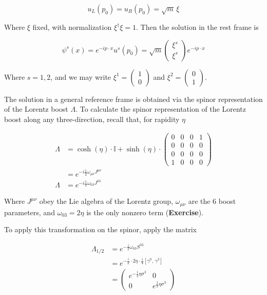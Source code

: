 \begin{equation}
u_L(p_0) = u_R(p_0) = \sqrt{m} \, \xi
\end{equation}

\noindent Where $\xi$ fixed, with normalization $\xi^\dagger \xi = 1$. Then the solution in the rest frame is 

\begin{equation}
\psi^s(x) = e^{-i p \cdot x} u^s(p_0) = \sqrt{m} \left(\begin{array}{c} \xi^s \\ \xi^s \end{array} \right) e^{-i p \cdot x}
\end{equation}

\noindent Where $s=1,2$, and we may write $\xi^1 = \left( \begin{array}{c} 1 \\ 0 \end{array} \right)$ and $\xi^2 = \left( \begin{array}{c} 0 \\ 1 \end{array} \right)$.

\noindent The solution in a general reference frame is obtained via the spinor representation of the Lorentz boost $\Lambda$. To calculate the spinor representation of the Lorentz boost along any three-direction, recall that, for rapidity $\eta$

\begin{align}
\Lambda &= \cosh (\eta) \cdot \mathbb{I} + \sinh(\eta) \cdot \left( \begin{array}{cccc} 0&0&0&1\\0&0&0&0\\0&0&0&0\\1&0&0&0 \end{array} \right) \\
&= e^{-i \frac{1}{2} \omega_{\mu\nu} J^{\mu\nu}} \\
\Lambda &= e^{-i \frac{1}{2} \omega_{0 3} J^{0 3} }
\end{align}

\noindent Where $J^{\mu\nu}$ obey the Lie algebra of the Lorentz group, $\omega_{\mu\nu}$ are the 6 boost parameters, and $\omega_{0 3}=2\eta$ is the only nonzero term (\textbf{Exercise}).

\noindent To apply this transformation on the spinor, apply the matrix

\begin{align}
\Lambda_{1/2} &= e^{-\frac{i}{2} \omega_{03} S^{03} }\\
&= e^{-\frac{i}{2} \cdot 2 \eta \cdot \frac{i}{4} [ \gamma^0, \, \gamma^3 ]} \\
&= \left( \begin{array}{cc} e^{-\frac{1}{2} \eta \sigma^3} & 0 \\ 0 & e^{\frac{1}{2} \eta \sigma^3} \end{array} \right) 
\end{align}


